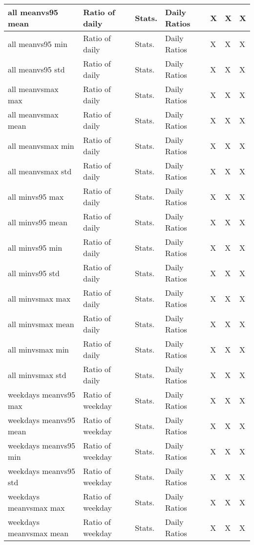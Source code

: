 {{\begin{longtable}[l]{ | p{4cm} | p{4cm} | p{1cm} | p{2cm} | p{0.3cm} | p{0.3cm} | p{0.3cm} |}
	 all meanvs95 mean & Ratio of daily  & Stats. & Daily Ratios & X & X & X \\ \hline
	 all meanvs95 min & Ratio of daily  & Stats. & Daily Ratios & X & X & X \\ \hline
	 all meanvs95 std & Ratio of daily  & Stats. & Daily Ratios & X & X & X \\ \hline
	 all meanvsmax max & Ratio of daily  & Stats. & Daily Ratios & X & X & X \\ \hline
	 all meanvsmax mean & Ratio of daily  & Stats. & Daily Ratios & X & X & X \\ \hline
	 all meanvsmax min & Ratio of daily  & Stats. & Daily Ratios & X & X & X \\ \hline
	 all meanvsmax std & Ratio of daily  & Stats. & Daily Ratios & X & X & X \\ \hline
	 all minvs95 max & Ratio of daily  & Stats. & Daily Ratios & X & X & X \\ \hline
	 all minvs95 mean & Ratio of daily  & Stats. & Daily Ratios & X & X & X \\ \hline
	 all minvs95 min & Ratio of daily  & Stats. & Daily Ratios & X & X & X \\ \hline
	 all minvs95 std & Ratio of daily  & Stats. & Daily Ratios & X & X & X \\ \hline
	 all minvsmax max & Ratio of daily  & Stats. & Daily Ratios & X & X & X \\ \hline
	 all minvsmax mean & Ratio of daily  & Stats. & Daily Ratios & X & X & X \\ \hline
	 all minvsmax min & Ratio of daily  & Stats. & Daily Ratios & X & X & X \\ \hline
	 all minvsmax std & Ratio of daily  & Stats. & Daily Ratios & X & X & X \\ \hline
	 weekdays meanvs95 max & Ratio of weekday  & Stats. & Daily Ratios & X & X & X \\ \hline
	 weekdays meanvs95 mean & Ratio of weekday  & Stats. & Daily Ratios & X & X & X \\ \hline
	 weekdays meanvs95 min & Ratio of weekday  & Stats. & Daily Ratios & X & X & X \\ \hline
	 weekdays meanvs95 std & Ratio of weekday  & Stats. & Daily Ratios & X & X & X \\ \hline
	 weekdays meanvsmax max & Ratio of weekday  & Stats. & Daily Ratios & X & X & X \\ \hline
	 weekdays meanvsmax mean & Ratio of weekday  & Stats. & Daily Ratios & X & X & X \\ \hline

\end{longtable}}}
